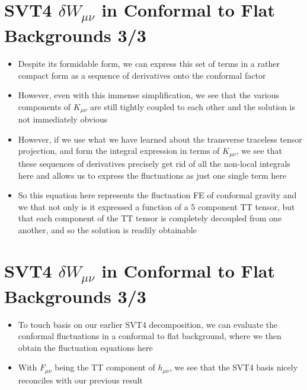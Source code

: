 \documentclass[10pt,letterpaper]{article}
\numberwithin{equation}{section}
\begin{document}
\section{SVT4 $\delta W_{\mu\nu}$ in Conformal to Flat Backgrounds 3/3}
\begin{itemize}
	\item Despite its formidable form, we can express this set of terms in a rather compact form as a sequence of derivatives onto the conformal factor
	\item However, even with this immense simplification, we see that the various components of $K_{\mu\nu}$ are still tightly coupled to each other and the solution is not immediately obvious
	\item However, if we use what we have learned about the transverse traceless tensor projection, and form the integral expression in terms of $K_{\mu\nu}$, we see that these sequences of derivatives precisely get rid of all the non-local integrals here and allows us to express the fluctuations as just one single term here
	\item So this equation here represents the fluctuation FE of conformal gravity and we that not only is it expressed a function of a 5 component TT tensor, but that each component of the TT tensor is completely decoupled from one another, and so the solution is readily obtainable
\end{itemize}


\section{SVT4 $\delta W_{\mu\nu}$ in Conformal to Flat Backgrounds 3/3}
\begin{itemize}
	\item To touch basis on our earlier SVT4 decomposition, we can evaluate the conformal fluctuations in a conformal to flat background, where we then obtain the fluctuation equations here
	\item With $F_{\mu\nu}$ being the TT component of $h_{\mu\nu}$, we see that the SVT4 basis nicely reconciles with our previous result
\end{itemize}


\end{document}
